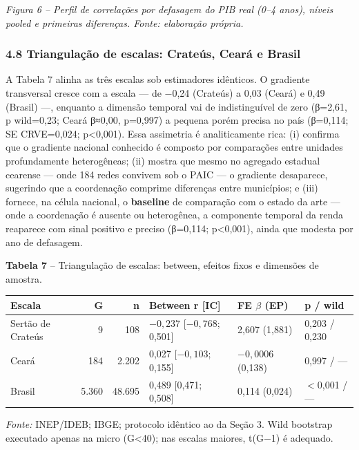 \documentclass[
  brazilian,
  12pt,
  a4paper,
]{article}
\begin{document}
\emph{Figura 6 -- Perfil de correlações por defasagem do PIB real (0--4
anos), níveis pooled e primeiras diferenças. Fonte: elaboração própria.}

\subsubsection{4.8 Triangulação de escalas: Crateús, Ceará e
Brasil}\label{triangulauxe7uxe3o-de-escalas-crateuxfas-cearuxe1-e-brasil}

A Tabela 7 alinha as três escalas sob estimadores idênticos. O gradiente
transversal cresce com a escala --- de −0,24 (Crateús) a 0,03 (Ceará) e
0,49 (Brasil) ---, enquanto a dimensão temporal vai de indistinguível de
zero (β=2,61, p wild=0,23; Ceará β≈0,00, p=0,997) a pequena porém
precisa no país (β=0,114; SE CRVE=0,024; p\textless0,001). Essa
assimetria é analiticamente rica: (i) confirma que o gradiente nacional
conhecido é composto por comparações entre unidades profundamente
heterogêneas; (ii) mostra que mesmo no agregado estadual cearense ---
onde 184 redes convivem sob o PAIC --- o gradiente desaparece, sugerindo
que a coordenação comprime diferenças entre municípios; e (iii) fornece,
na célula nacional, o \textbf{baseline} de comparação com o estado da
arte --- onde a coordenação é ausente ou heterogênea, a componente
temporal da renda reaparece com sinal positivo e preciso (β=0,114;
p\textless0,001), ainda que modesta por ano de defasagem.

\textbf{Tabela 7} -- Triangulação de escalas: between, efeitos fixos e
dimensões de amostra.

\begin{table}[htbp]
\centering
\footnotesize
\setlength{\tabcolsep}{3pt}
\begin{tabular}{@{}lrrlll@{}}
\hline
Escala & G & n & Between r [IC] & FE $\beta$ (EP) & p / wild \\
\hline
Sertão de Crateús & 9 & 108 & $-0,237$ [$-0,768$; 0,501] & 2,607 (1,881) & 0,203 / 0,230 \\
Ceará & 184 & 2.202 & 0,027 [$-0,103$; 0,155] & $-0,0006$ (0,138) & 0,997 / --- \\
Brasil & 5.360 & 48.695 & 0,489 [0,471; 0,508] & 0,114 (0,024) & $<$0,001 / --- \\
\hline
\end{tabular}
\end{table}

\emph{Fonte:} INEP/IDEB; IBGE; protocolo idêntico ao da Seção 3. Wild
bootstrap executado apenas na micro (G\textless40); nas escalas maiores,
t(G−1) é adequado.
\end{document}
